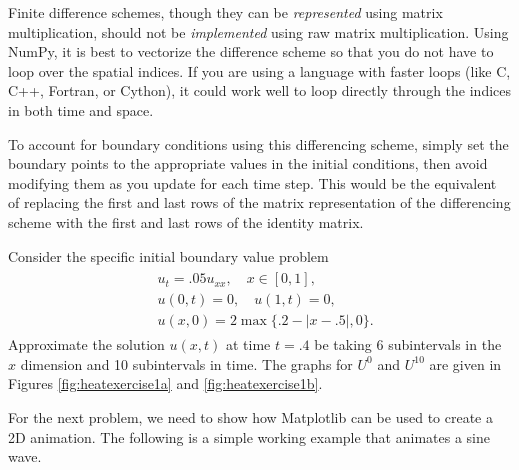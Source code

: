 \begin{info}
Finite difference schemes, though they can be \emph{represented} using matrix multiplication, should not be \emph{implemented} using raw matrix multiplication.
Using NumPy, it is best to vectorize the difference scheme so that you do not have to loop over the spatial indices.
If you are using a language with faster loops (like C, C++, Fortran, or Cython), it could work well to loop directly through the indices in both time and space.
\end{info}

To account for boundary conditions using this differencing scheme, simply set the boundary points to the appropriate values in the initial conditions, then avoid modifying them as you update for each time step.
This would be the equivalent of replacing the first and last rows of the matrix representation of the differencing scheme with the first and last rows of the identity matrix.

\begin{problem}
\label{prob:heat_exercise1}
Consider the specific initial boundary value problem
\begin{align}
	\begin{split}
	&{ } u_t = .05 u_{xx}, \quad x \in [0,1], \\
	&{ } u(0,t) = 0,\quad u(1,t) = 0,\\
	&{ } u(x,0) = 2\max\{.2 - |x-.5|,0\}.
	\end{split}
\end{align}
Approximate the solution $u(x,t)$ at time $t = .4$ be taking 6 subintervals in the $x$ dimension and 10 subintervals in time. 
The graphs for $U^0$ and $U^{10}$ are given in Figures \ref{fig:heatexercise1a} and \ref{fig:heatexercise1b}.
\end{problem}

For the next problem, we need to show how Matplotlib can be used to create a 2D animation.
The following is a simple working example that animates a sine wave.


